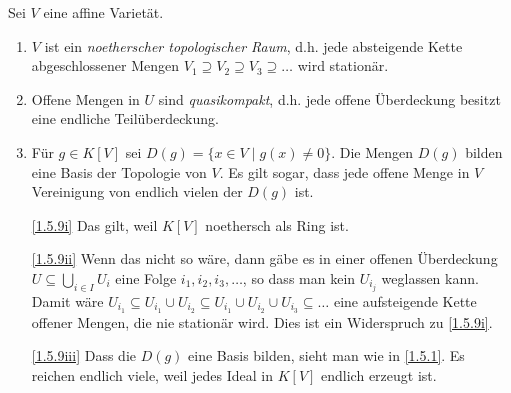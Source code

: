 \documentclass[a4paper,12pt]{scrbook}
\makeatletter
\theoremstyle{blah}
\theoremstyle{stz}
\renewcommand{\proofname}{Beweis}
\renewenvironment{proof}[1][\proofname]{\par
  \pushQED{\qed}%
  \normalfont \topsep6\p@\@plus6\p@\relax
  \trivlist
  \item[\hskip\labelsep
        \itshape
    #1\@addpunct{:}]\ignorespaces
}{%
  \popQED\endtrivlist\@endpefalse
}
\makeatother
\begin{document}
\begin{bem}\label{1.5.9}
  Sei $V$ eine affine Varietät.
  \begin{enumerate}
  \item\label{1.5.9i} $V$ ist ein \emph{noetherscher topologischer Raum}, d.h. jede absteigende Kette abgeschlossener Mengen
    $V_1\supseteq V_2\supseteq V_3\supseteq\dotso$ wird stationär.
  \item\label{1.5.9ii} Offene Mengen in $U$ sind \emph{quasikompakt}, d.h. jede offene Überdeckung besitzt eine endliche
    Teilüberdeckung.
  \item\label{1.5.9iii} Für $g\in K[V]$ sei $D(g)=\{x\in V\mid g(x)\neq0\}$. Die Mengen $D(g)$ bilden eine Basis der Topologie
    von $V$. Es gilt sogar, dass jede offene Menge in $V$ Vereinigung von endlich vielen der $D(g)$ ist.
  \end{enumerate}
\end{bem}
\begin{proof}
  \begin{enumerate}
  \item[\ref{1.5.9i}] Das gilt, weil $K[V]$ noethersch als Ring ist.
  \item[\ref{1.5.9ii}] Wenn das nicht so wäre, dann gäbe es in einer offenen Überdeckung $U\subseteq\bigcup_{i\in I}U_i$ eine
    Folge $i_1,i_2,i_3,\dotsc$, so dass man kein $U_{i_j}$ weglassen kann. Damit wäre $U_{i_1}\subseteq U_{i_1}\cup U_{i_2}
    \subseteq U_{i_1}\cup U_{i_2}\cup U_{i_3}\subseteq \dotso$ eine aufsteigende Kette offener Mengen, die nie stationär
    wird. Dies ist ein Widerspruch zu \ref{1.5.9i}.
  \item[\ref{1.5.9iii}] Dass die $D(g)$ eine Basis bilden, sieht man wie in \autoref{1.5.1}. Es reichen endlich viele, weil
    jedes Ideal in $K[V]$ endlich erzeugt ist.
  \end{enumerate}
\end{proof}

\end{document}
